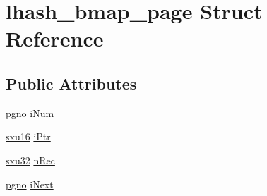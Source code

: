 \hypertarget{structlhash__bmap__page}{\section{lhash\-\_\-bmap\-\_\-page Struct Reference}
\label{d3/d6f/structlhash__bmap__page}
}
\subsection*{Public Attributes}
\begin{DoxyCompactItemize}
\item 
\hyperlink{unqlite_8c_a90bf132c9229151f7c29e84e592907cd}{pgno} \hyperlink{structlhash__bmap__page_a75e4663046dbf7322742ada25927f2e5}{i\-Num}
\item 
\hyperlink{unqlite_8c_a0fea45724d256332e7ae0104f83260a7}{sxu16} \hyperlink{structlhash__bmap__page_ae7ea32d4ef5d7bc09820accd34218446}{i\-Ptr}
\item 
\hyperlink{unqlite_8c_abc5a8a3f345c200c98c485551f49666e}{sxu32} \hyperlink{structlhash__bmap__page_ab68c6df09b19a84ead9acd3faa111e8e}{n\-Rec}
\item 
\hyperlink{unqlite_8c_a90bf132c9229151f7c29e84e592907cd}{pgno} \hyperlink{structlhash__bmap__page_aa2d80563adb2fa0b82ddb06be5413491}{i\-Next}
\end{DoxyCompactItemize}


